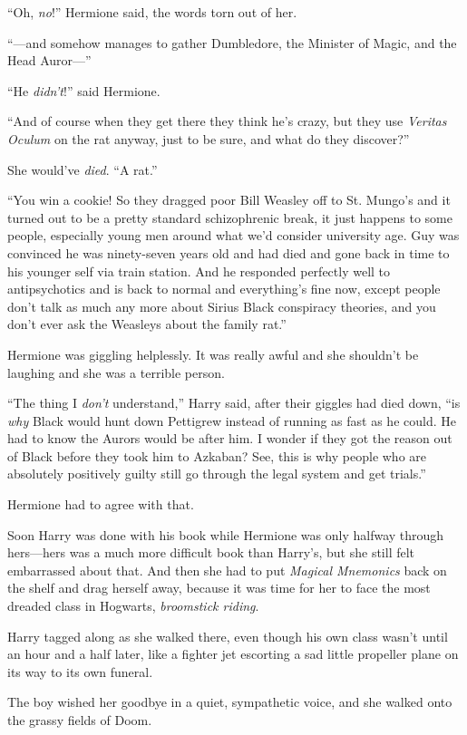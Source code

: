“Oh, \emph{no}!” Hermione said, the words torn out of her.

“—and somehow manages to gather Dumbledore, the Minister of Magic, and the Head Auror—”

“He \emph{didn’t}!” said Hermione.

“And of course when they get there they think he’s crazy, but they use \emph{Veritas Oculum} on the rat anyway, just to be sure, and what do they discover?”

She would’ve \emph{died}.
“A rat.”

“You win a cookie! So they dragged poor Bill Weasley off to St. Mungo’s and it turned out to be a pretty standard schizophrenic break, it just happens to some people, especially young men around what we’d consider university age. Guy was convinced he was ninety-seven years old and had died and gone back in time to his younger self via train station. And he responded perfectly well to antipsychotics and is back to normal and everything’s fine now, except people don’t talk as much any more about Sirius Black conspiracy theories, and you don’t ever ask the Weasleys about the family rat.”

Hermione was giggling helplessly. It was really awful and she shouldn’t be laughing and she was a terrible person.

“The thing I \emph{don’t} understand,” Harry said, after their giggles had died down, “is \emph{why} Black would hunt down Pettigrew instead of running as fast as he could. He had to know the Aurors would be after him. I wonder if they got the reason out of Black before they took him to Azkaban? See, this is why people who are absolutely positively guilty still go through the legal system and get trials.”

Hermione had to agree with that.

Soon Harry was done with his book while Hermione was only halfway through hers—hers was a much more difficult book than Harry’s, but she still felt embarrassed about that. And then she had to put \emph{Magical Mnemonics} back on the shelf and drag herself away, because it was time for her to face the most dreaded class in Hogwarts, \emph{broomstick riding}.

Harry tagged along as she walked there, even though his own class wasn’t until an hour and a half later, like a fighter jet escorting a sad little propeller plane on its way to its own funeral.

The boy wished her goodbye in a quiet, sympathetic voice, and she walked onto the grassy fields of Doom.

